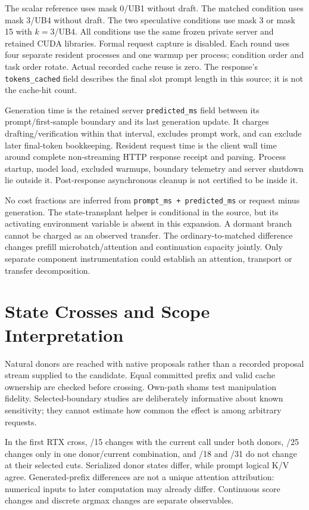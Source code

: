 The scalar reference uses mask 0/UB1 without draft. The matched condition uses mask 3/UB4 without draft. The two speculative conditions use mask 3 or mask 15 with $k=3$/UB4. All conditions use the same frozen private server and retained CUDA libraries. Formal request capture is disabled. Each round uses four separate resident processes and one warmup per process; condition order and task order rotate. Actual recorded cache reuse is zero. The response's \texttt{tokens\_cached} field describes the final slot prompt length in this source; it is not the cache-hit count.

Generation time is the retained server \texttt{predicted\_ms} field between its prompt/first-sample boundary and its last generation update. It charges drafting/verification within that interval, excludes prompt work, and can exclude later final-token bookkeeping. Resident request time is the client wall time around complete non-streaming HTTP response receipt and parsing. Process startup, model load, excluded warmups, boundary telemetry and server shutdown lie outside it. Post-response asynchronous cleanup is not certified to be inside it.

No cost fractions are inferred from \texttt{prompt\_ms + predicted\_ms} or request minus generation. The state-transplant helper is conditional in the source, but its activating environment variable is absent in this expansion. A dormant branch cannot be charged as an observed transfer. The ordinary-to-matched difference changes prefill microbatch/attention and continuation capacity jointly. Only separate component instrumentation could establish an attention, transport or transfer decomposition.

\section{State Crosses and Scope Interpretation}
Natural donors are reached with native proposals rather than a recorded proposal stream supplied to the candidate. Equal committed prefix and valid cache ownership are checked before crossing. Own-path shams test manipulation fidelity. Selected-boundary studies are deliberately informative about known sensitivity; they cannot estimate how common the effect is among arbitrary requests.

In the first RTX cross, /15 changes with the current call under both donors, /25 changes only in one donor/current combination, and /18 and /31 do not change at their selected cuts. Serialized donor states differ, while prompt logical K/V agree. Generated-prefix differences are not a unique attention attribution: numerical inputs to later computation may already differ. Continuous score changes and discrete argmax changes are separate observables.

